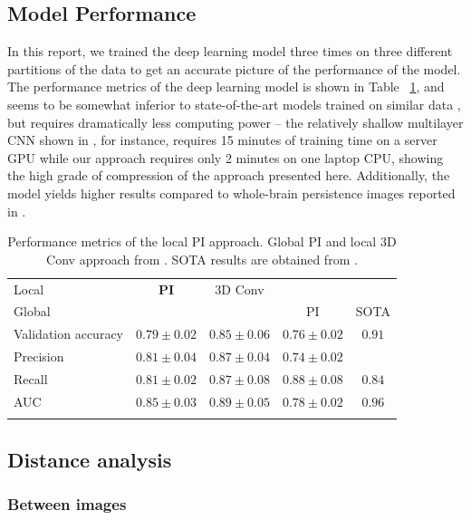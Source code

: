 \documentclass{article}
\begin{document}
\subsection{Model Performance}

In this report, we trained the deep learning model three times on three different partitions of the
data to get an accurate picture of the performance of the model. The performance metrics of the deep
learning model is shown in Table ~\ref{tab:performance}, and seems to be somewhat inferior to
state-of-the-art models trained on similar data \citep{wen2020convolutional}, but requires
dramatically less computing power -- the relatively shallow multilayer CNN shown in
\citep{bruningk2020image}, for instance, requires 15 minutes of training time on a server GPU while
our approach requires only 2 minutes on one laptop CPU, showing the high grade of compression of the
approach presented here. Additionally, the model yields higher results compared to whole-brain
persistence images reported in \citep{bruningk2020image}.

\begin{table}[b]
  \centering
  \begin{tabular}{lcccc}
    \toprule Local & \textbf{PI} & 3D Conv & & \\ Global &&& PI & SOTA \\ \midrule Validation
    accuracy & $0.79\pm 0.02$ & $0.85\pm 0.06$ & $ 0.76\pm 0.02$ & $0.91$\\ Precision & $0.81\pm
    0.04$ & $0.87\pm0.04$ & $0.74\pm 0.02$& \\ Recall & $0.81\pm 0.02$ & $0.87\pm0.08$ & $0.88\pm
    0.08$ &$0.84$\\ AUC & $0.85\pm 0.03$ & $0.89\pm0.05$ & $ 0.78\pm 0.02$ & $0.96$\\ \bottomrule
    \vspace{1pt}
  \end{tabular}
  \caption{Performance metrics of the local PI approach. Global PI and local 3D Conv approach from
    \citep{bruningk2020image}. SOTA results are obtained from \citep{liu2018anatomical}.}
  \label{tab:performance}
\end{table}

\subsection{Distance analysis}

\subsubsection{Between images}\label{sec:results_between_images}
\end{document}
